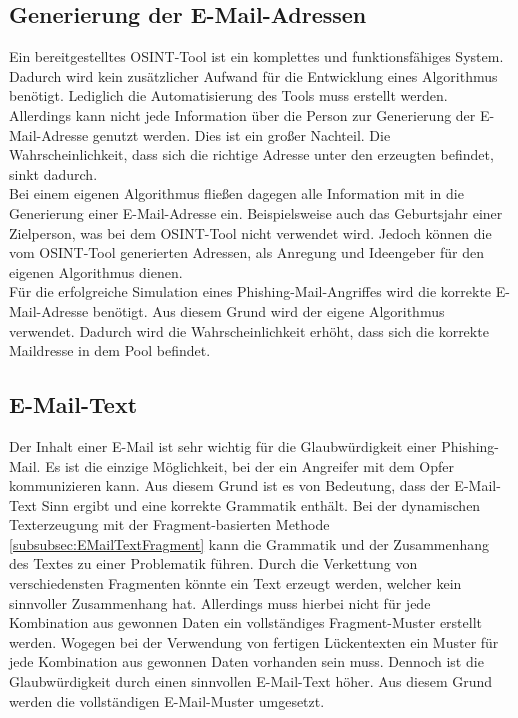 	\subsection{Generierung der E-Mail-Adressen}
	Ein bereitgestelltes OSINT-Tool ist ein komplettes und funktionsfähiges System. Dadurch wird kein zusätzlicher Aufwand für die Entwicklung eines Algorithmus benötigt. Lediglich die Automatisierung des Tools muss erstellt werden. Allerdings kann nicht jede Information über die Person zur Generierung der E-Mail-Adresse genutzt werden. Dies ist ein großer Nachteil. Die Wahrscheinlichkeit, dass sich die richtige Adresse unter den erzeugten befindet, sinkt dadurch.\\
	Bei einem eigenen Algorithmus fließen dagegen alle Information mit in die Generierung einer E-Mail-Adresse ein. Beispielsweise auch das Geburtsjahr einer Zielperson, was bei dem OSINT-Tool \cite{EmailAssumptions} nicht verwendet wird. Jedoch können die vom OSINT-Tool generierten Adressen, als Anregung und Ideengeber für den eigenen Algorithmus dienen.\\
	Für die erfolgreiche Simulation eines Phishing-Mail-Angriffes wird die korrekte E-Mail-Adresse benötigt. Aus diesem Grund wird der eigene Algorithmus verwendet. Dadurch wird die Wahrscheinlichkeit erhöht, dass sich die korrekte Maildresse in dem Pool befindet.
	
	\subsection{E-Mail-Text}
	Der Inhalt einer E-Mail ist sehr wichtig für die Glaubwürdigkeit einer Phishing-Mail. Es ist die einzige Möglichkeit, bei der ein Angreifer mit dem Opfer kommunizieren kann. Aus diesem Grund ist es von Bedeutung, dass der E-Mail-Text Sinn ergibt und eine korrekte Grammatik enthält. Bei der dynamischen Texterzeugung mit der Fragment-basierten Methode \ref{subsubsec:EMailTextFragment} kann die Grammatik und der Zusammenhang des Textes zu einer Problematik führen. Durch die Verkettung von verschiedensten Fragmenten könnte ein Text erzeugt werden, welcher kein sinnvoller Zusammenhang hat. Allerdings muss hierbei nicht für jede Kombination aus gewonnen Daten ein vollständiges Fragment-Muster erstellt werden. Wogegen bei der Verwendung von fertigen Lückentexten ein Muster für jede Kombination aus gewonnen Daten vorhanden sein muss. Dennoch ist die Glaubwürdigkeit durch einen sinnvollen E-Mail-Text höher. Aus diesem Grund werden die vollständigen E-Mail-Muster umgesetzt.


	
